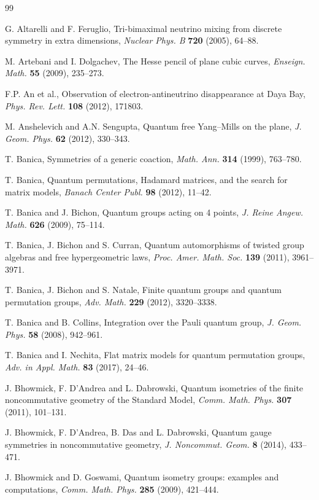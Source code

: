 \documentclass[11pt]{amsart}
\theoremstyle{definition}
\begin{document}
\begin{thebibliography}{99}

 G. Altarelli and F. Feruglio, Tri-bimaximal neutrino mixing from discrete symmetry in extra dimensions, {\em Nuclear Phys. B} {\bf 720} (2005), 64--88.

 M. Artebani and I. Dolgachev, The Hesse pencil of plane cubic curves, {\em Enseign. Math.} {\bf 55} (2009), 235--273.

 F.P. An et al., Observation of electron-antineutrino disappearance at Daya Bay, {\em Phys. Rev. Lett.} {\bf 108} (2012), 171803.

 M. Anshelevich and A.N. Sengupta, Quantum free Yang--Mills on the plane, {\em J. Geom. Phys.} {\bf 62} (2012), 330--343.

 T. Banica, Symmetries of a generic coaction, {\em Math. Ann.} {\bf 314} (1999), 763--780.

 T. Banica, Quantum permutations, Hadamard matrices, and the search for matrix models, {\em Banach Center Publ.} {\bf 98} (2012), 11--42.

 T. Banica and J. Bichon, Quantum groups acting on 4 points, {\em J. Reine Angew. Math.} {\bf 626} (2009), 75--114.

 T. Banica, J. Bichon and S. Curran, Quantum automorphisms of twisted group algebras and free hypergeometric laws, {\em Proc. Amer. Math. Soc.} {\bf 139} (2011), 3961--3971.

 T. Banica, J. Bichon and S. Natale, Finite quantum groups and quantum permutation groups, {\em Adv. Math.} {\bf 229} (2012), 3320--3338.

 T. Banica and B. Collins, Integration over the Pauli quantum group, {\em J. Geom. Phys.} {\bf 58} (2008), 942--961.

 T. Banica and I. Nechita, Flat matrix models for quantum permutation groups, {\em Adv. in Appl. Math.} {\bf 83} (2017), 24--46.

 J. Bhowmick, F. D'Andrea and L. Dabrowski, Quantum isometries of the finite noncommutative geometry of the Standard Model, {\em Comm. Math. Phys.} {\bf 307} (2011), 101--131.

 J. Bhowmick, F. D'Andrea, B. Das and L. Dabrowski, Quantum gauge symmetries in noncommutative geometry, {\em J. Noncommut. Geom.} {\bf 8} (2014), 433--471.

 J. Bhowmick and D. Goswami, Quantum isometry groups: examples and computations, {\em Comm. Math. Phys.} {\bf 285} (2009), 421--444.


\end{thebibliography}
\end{document}
